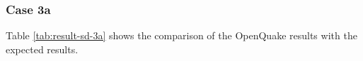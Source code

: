 \subsubsection{Case 3a}


Table \ref{tab:result-sd-3a} shows the comparison of the OpenQuake results with the expected results.
